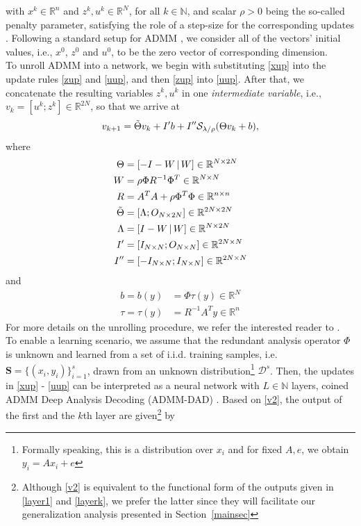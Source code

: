 \documentclass[preprint,12pt]{elsarticle}
\newcommand{\rn}{\mathbb{R}^n}
\newcommand{\st}{\mathcal{S}}\newcommand{\sgn}{\mathrm{sign}}
\begin{document}
with $x^k\in\rn$ and $z^k,u^k\in\mathbb{R}^N$, for all $k\in\mathbb{N}$, and scalar $\rho>0$ being the so-called penalty parameter, satisfying the role of a step-size for the corresponding updates \cite{boyd:5}. Following a standard setup for ADMM \cite{boyd:5}, we consider all of the vectors' initial values, i.e., $x^0$, $z^0$ and $u^0$, to be the zero vector of corresponding dimension.\\
To unroll ADMM into a network, we begin with substituting \eqref{xup} into the update rules \eqref{zup} and \eqref{uup}, and then \eqref{zup} into \eqref{uup}. After that, we concatenate the resulting variables $z^k,u^k$ in one \textit{intermediate variable}, i.e., $v_k=[u^k;z^k]\in\mathbb{R}^{2N}$, so that we arrive at
\begin{equation}\label{v2}
    v_{k+1}=\Tilde{\Theta}v_k+I'b+I''\st_{\lambda/\rho}(\Theta v_k+b),
\end{equation}
where
\begin{align}
    \Theta&=[-I-W\,|\,W]\in\mathbb{R}^{N\times 2N}\\
    W&=\rho\Phi R^{-1}\Phi^T\in\mathbb{R}^{N\times N}\\
    R&=A^TA+\rho\Phi^T\Phi\in\mathbb{R}^{n\times n}\\
    \Tilde{\Theta}&=[\Lambda;O_{N\times 2N}]\in\mathbb{R}^{2N\times 2N}\\
    \Lambda&=[I-W\,|\,W]\in\mathbb{R}^{N\times 2N}\\
    I'&=[I_{N\times N};O_{N\times N}]\in\mathbb{R}^{2N\times N}\\
    I''&=[-I_{N\times N};I_{N\times N}]\in\mathbb{R}^{2N\times N}
\end{align}
and
\begin{align}
    b=b(y)&=\Phi\tau(y)\in\mathbb{R}^{N}\\
    \label{toft}
    \tau=\tau(y)&=R^{-1}A^Ty\in\rn
\end{align}
For more details on the unrolling procedure, we refer the interested reader to \cite{admmdad}.\\
To enable a learning scenario, we assume that the redundant analysis operator $\Phi$ is unknown and learned from a set of i.i.d. training samples, i.e. $\mathbf{S}=\{(x_i,y_i)\}_{i=1}^s$, drawn from an unknown distribution\footnote{Formally speaking, this is a distribution over $x_i$ and for fixed $A,e$, we obtain $y_i=Ax_i+e$} $\mathcal{D}^s$. Then, the updates in \eqref{xup} - \eqref{uup} can be interpreted as a neural network with $L\in\mathbb{N}$ layers, coined ADMM Deep Analysis Decoding (ADMM-DAD) \cite{admmdad}. Based on \eqref{v2}, the output of the first and the $k$th layer are given\footnote{Although \eqref{v2} is equivalent to the functional form of the outputs given in \eqref{layer1} and \eqref{layerk}, we prefer the latter since they will facilitate our generalization analysis presented in Section~\ref{mainsec}} by
\end{document}
